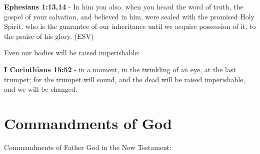 \documentclass[11pt]{article}
\begin{document}
\textbf{Ephesians 1:13,14} -  In him you also, when you heard the word of truth, the gospel of your salvation, and believed in him, were sealed with the promised Holy Spirit, who is the guarantee of our inheritance until we acquire possession of it, to the praise of his glory.  (ESV)

Even our bodies will be raised imperishable:

\textbf{I Corinthians 15:52} - in a moment, in the twinkling of an eye, at the last trumpet; for the trumpet will sound, and the dead will be raised imperishable, and we will be changed.

\section{Commandments of God}
\label{sec:org71386b5}
Commandments of Father God in the New Testament:
\end{document}
